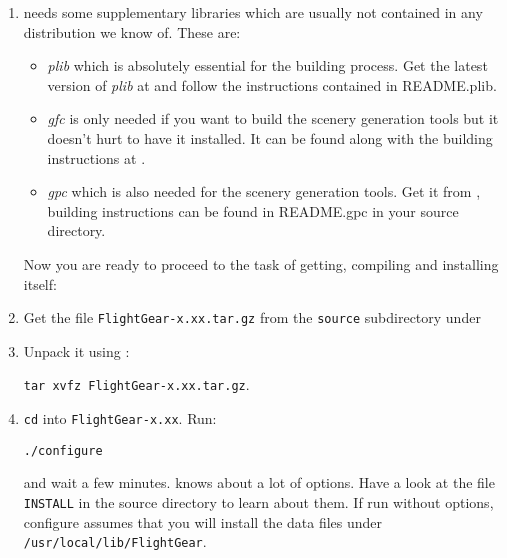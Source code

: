 \begin{enumerate}


\item \FlightGear needs some supplementary libraries which are usually
  not contained in any distribution we know of. These are:

  \begin{itemize}

  \item{{\em plib}} which is absolutely essential for the building
    process. Get the latest version of {\em plib} at
     and follow the
    instructions contained in README.plib.

  \item{{\em gfc}} is only needed if you want to build the scenery
    generation tools but it doesn't hurt to have it installed. It can
    be found along with the building instructions at
    .

  \item{{\em gpc}} which is also needed for the scenery generation
    tools. Get it from
    , building
    instructions can be found in README.gpc in your \FlightGear source
    directory.

  \end{itemize}

  Now you are ready to proceed to the task of getting, compiling and installing \FlightGear itself:

\item Get the file \texttt{FlightGear-x.xx.tar.gz} from the
  \texttt{source} subdirectory under


 \noindent

\item Unpack it using :

        \texttt{tar xvfz FlightGear-x.xx.tar.gz}.

\item \texttt{cd} into \texttt{FlightGear-x.xx}. Run:

        \texttt{./configure}

 \noindent
and wait a few minutes.  knows about a lot of
options. Have a look at the file \texttt{INSTALL} in the
\FlightGear source directory to learn about them. If run without
options, configure assumes that you will install the data files
under \texttt{/usr/local/lib/FlightGear}.



\end{enumerate}
